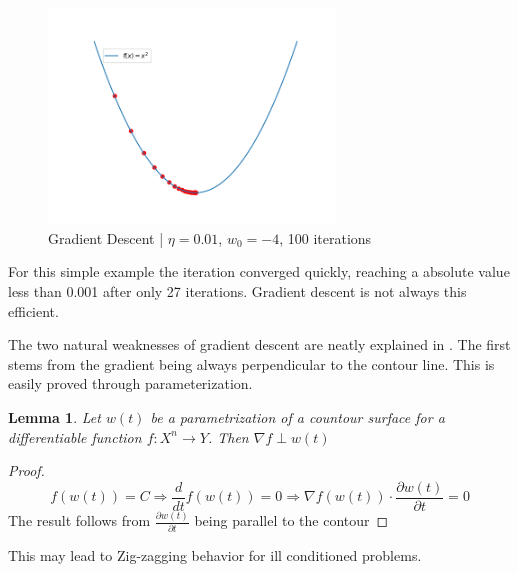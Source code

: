 \documentclass{article}
\newtheorem{lemma}[theorem]{Lemma}
\theoremstyle{definition}
\begin{document}
\begin{figure}[H]
    \centering
    \includegraphics[width=0.68\textwidth]{Project2/figures/simple_gradient_descent.png}
    \caption{Gradient Descent | $\eta = 0.01$, $w_0 = -4$, 100 iterations}
    \label{fig:simple_gradient_descent}
\end{figure}
For this simple example the iteration converged quickly, reaching a absolute value less than 0.001 after only 27 iterations. Gradient descent is not always this efficient. 

The two natural weaknesses of gradient descent are neatly explained in \cite[p.~65--71]{MLRefined}. The first stems from the gradient being always perpendicular to the contour line. This is easily proved through parameterization.


\begin{lemma}
    Let $w(t)$ be a parametrization of a countour surface for a differentiable function $f: X^n \rightarrow Y$. Then $\nabla f \perp w(t) $ 
\end{lemma}

\begin{proof}
$$f(w(t)) = C \Rightarrow \frac{d}{dt} f(w(t)) = 0 \Rightarrow \nabla f(w(t)) \cdot \frac{\partial w(t)}{\partial t} = 0$$
The result follows from $\frac{\partial w(t)}{\partial t}$ being parallel to the contour
\end{proof}

This may lead to Zig-zagging behavior for ill conditioned problems.
\end{document}
